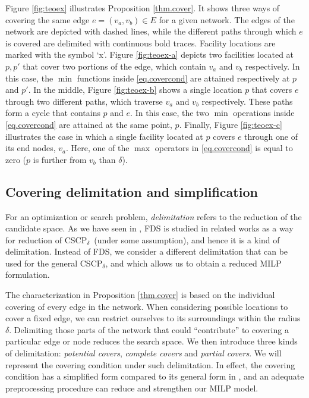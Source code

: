 \documentclass[review]{elsarticle}
\newcommand{\dlt}{{\delta}}
\newcommand{\problem}{CSCP$_\dlt$}
\theoremstyle{definition}
\begin{document}
Figure \ref{fig:teoex} illustrates Proposition \ref{thm.cover}. It shows three ways of covering the same edge $e=(v_a,v_b)\in E$ for a given network. The edges of the network are depicted with dashed lines, while the different paths through which $e$ is covered are delimited with continuous bold traces. Facility locations are marked with the symbol `x'. Figure \ref{fig:teoex-a} depicts two facilities located at $p,p'$ that cover two portions of the edge, which contain $v_a$ and $v_b$ respectively. In this case, the $\min$ functions inside \eqref{eq.covercond} are attained respectively at $p$ and $p'$. In the middle,  Figure \ref{fig:teoex-b} shows a single location $p$ that covers $e$ through two different paths, which traverse $v_a$ and $v_b$ respectively. These paths form a cycle that contains $p$ and $e$. In this case,  the two $\min$ operations inside \eqref{eq.covercond} are attained at the same point, $p$. Finally, Figure \ref{fig:teoex-c} illustrates the case in which a single facility located at $p$ covers $e$ through one of its end nodes, $v_a$. Here, one of the $\max$ operators in \eqref{eq.covercond} is equal to zero ($p$ is further from $v_b$ than $\dlt$).

\subsection{Covering delimitation and simplification}
\label{sec.subc}

For an optimization or search problem, \textit{delimitation} refers to the reduction of the candidate space. As we have seen in , FDS is studied in related works as a way for reduction of \problem\ (under some assumption), and hence it is a kind of delimitation. Instead of FDS, we consider a different delimitation that can be used for the general \problem, and which allows us to obtain a reduced MILP formulation.

The characterization in Proposition \ref{thm.cover} is based on the individual covering of every edge in the network. When considering possible locations to cover a fixed edge, we can restrict ourselves to its surroundings within the radius $\dlt$. Delimiting those parts of the network that could ``contribute'' to covering a particular edge or node reduces the search space. We  then introduce three kinds of delimitation: \textit{potential covers}, \textit{complete covers} and \textit{partial covers}.   We will represent the covering condition under such delimitation. In effect, the covering condition has a simplified form compared to its general form in , and an adequate preprocessing procedure can reduce and strengthen our MILP model.
\end{document}
